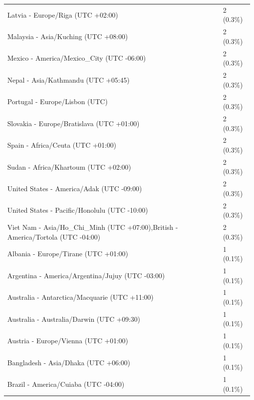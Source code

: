 \documentclass[
  english,
  man]{apa6}
\begin{document}
\begin{appendix}
\begin{table}
{\begin{tabular}[t]{ll}
\hspace{1em}Latvia - Europe/Riga (UTC +02:00) & 2 (0.3\%)\\
\hspace{1em}Malaysia - Asia/Kuching (UTC +08:00) & 2 (0.3\%)\\
\addlinespace
\hspace{1em}Mexico - America/Mexico\_City (UTC -06:00) & 2 (0.3\%)\\
\hspace{1em}Nepal - Asia/Kathmandu (UTC +05:45) & 2 (0.3\%)\\
\hspace{1em}Portugal - Europe/Lisbon (UTC) & 2 (0.3\%)\\
\hspace{1em}Slovakia - Europe/Bratislava (UTC +01:00) & 2 (0.3\%)\\
\hspace{1em}Spain - Africa/Ceuta (UTC +01:00) & 2 (0.3\%)\\
\addlinespace
\hspace{1em}Sudan - Africa/Khartoum (UTC +02:00) & 2 (0.3\%)\\
\hspace{1em}United States - America/Adak (UTC -09:00) & 2 (0.3\%)\\
\hspace{1em}United States - Pacific/Honolulu (UTC -10:00) & 2 (0.3\%)\\
\hspace{1em}Viet Nam - Asia/Ho\_Chi\_Minh (UTC +07:00),British - America/Tortola (UTC -04:00) & 2 (0.3\%)\\
\hspace{1em}Albania - Europe/Tirane (UTC +01:00) & 1 (0.1\%)\\
\addlinespace
\hspace{1em}Argentina - America/Argentina/Jujuy (UTC -03:00) & 1 (0.1\%)\\
\hspace{1em}Australia - Antarctica/Macquarie (UTC +11:00) & 1 (0.1\%)\\
\hspace{1em}Australia - Australia/Darwin (UTC +09:30) & 1 (0.1\%)\\
\hspace{1em}Austria - Europe/Vienna (UTC +01:00) & 1 (0.1\%)\\
\hspace{1em}Bangladesh - Asia/Dhaka (UTC +06:00) & 1 (0.1\%)\\
\addlinespace
\hspace{1em}Brazil - America/Cuiaba (UTC -04:00) & 1 (0.1\%)\\

\end{tabular}}
\end{table}
\end{appendix}
\end{document}
